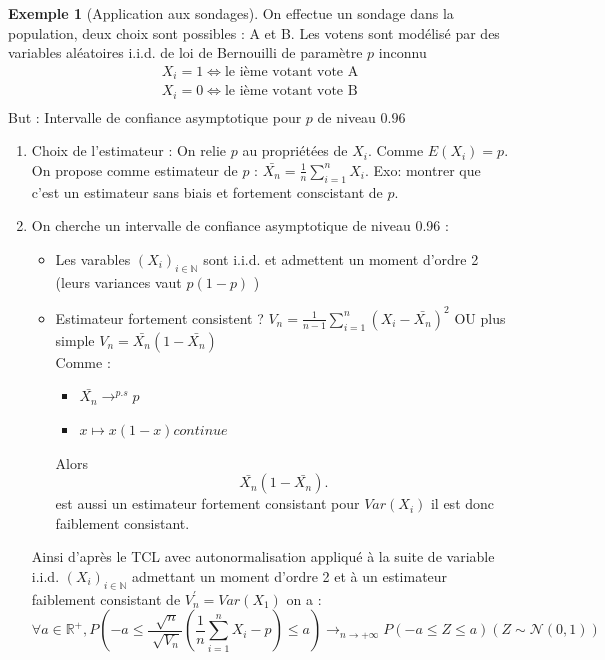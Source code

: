 \documentclass{article}
\theoremstyle{plain}%
\theoremstyle{definition}
\newtheorem{exmp}{Exemple}[section]
\theoremstyle{remark}
\begin{document}
\begin{exmp}[Application aux sondages]
    On effectue un sondage dans la population, deux choix sont possibles : A et B. Les votens sont modélisé par des variables aléatoires i.i.d. de loi de Bernouilli de paramètre $ p $ inconnu \begin{align*}
        X_i = 1 \Leftrightarrow \text{le ième votant vote A} \\
        X_i = 0 \Leftrightarrow \text{le ième votant vote B} \\
    \end{align*}
    But : Intervalle de confiance asymptotique pour $ p $ de niveau $ 0.96 $ 
    \begin{enumerate}
        \item Choix de l'estimateur : On relie $ p $ au propriétées de $ X_i $. Comme $ E(X_i) = p $. On propose comme estimateur de $ p $ : $ \bar{X_n} = \frac{1}{n}\sum_{i=1}^{n}X_i $. Exo: montrer que c'est un estimateur sans biais et fortement conscistant de $ p $.
        \item On cherche un intervalle de confiance asymptotique de niveau 0.96 : \begin{itemize}
            \item Les varables $ (X_i)_{i \in \mathbb{N}} $ sont i.i.d. et admettent un moment d'ordre 2 (leurs variances vaut $ p(1-p) $ )
            \item Estimateur fortement consistent ? $ V_n = \frac{1}{n-1}\sum_{i=1}^{n}(X_i - \bar{X_n})^2 $ OU plus simple $ V_n = \bar{X_n}(1 - \bar{X_n}) $ \\
            Comme : \begin{itemize}
                \item $ \bar{X_n} \to ^{p.s} p  $ 
                \item $ x \mapsto x(1-x) continue $ 
            \end{itemize}
            Alors 
            \[
                \bar{X_n}(1 - \bar{X_n})
            .\]
            est aussi un estimateur fortement consistant pour $ Var(X_i) $ il est donc faiblement consistant.
        \end{itemize}
        Ainsi d'après le TCL avec autonormalisation appliqué à la suite de variable i.i.d. $ (X_i)_{i \in \mathbb{N}} $ admettant un moment d'ordre 2 et à un estimateur faiblement consistant de $ V_n^\prime = Var(X_1) $ on a : 
        \[
            \forall a \in \mathbb{R}^+, P(-a \leq \frac{\sqrt[]{n}}{\sqrt[]{V_n}} (\frac{1}{n}\sum_{i=1}^{n}X_i - p) \leq a) \to_{n \to +\infty } P(-a \leq Z \leq a) (Z \sim \mathcal{N} (0,1))
\]
\end{enumerate}
\end{exmp}
\end{document}
